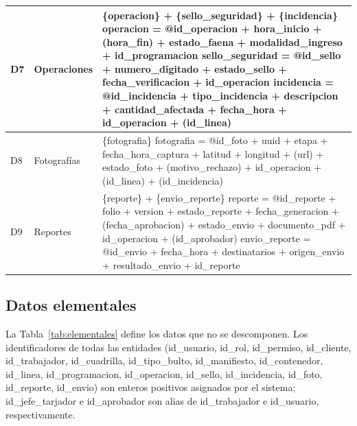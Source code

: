 {\begin{longtable}{|C{1.0cm}|L{2.4cm}|L{11.2cm}|}
D7 & Operaciones & \{operacion\} + \{sello\_seguridad\} + \{incidencia\} \newline
operacion = @id\_operacion + hora\_inicio + (hora\_fin) + estado\_faena +
modalidad\_ingreso + id\_programacion \newline
sello\_seguridad = @id\_sello + numero\_digitado + estado\_sello + fecha\_verificacion +
id\_operacion \newline
incidencia = @id\_incidencia + tipo\_incidencia + descripcion + cantidad\_afectada +
fecha\_hora + id\_operacion + (id\_linea) \\ \hline
D8 & Fotografías & \{fotografia\} \newline
fotografia = @id\_foto + uuid + etapa + fecha\_hora\_captura + latitud + longitud + (url) +
estado\_foto + (motivo\_rechazo) + id\_operacion + (id\_linea) + (id\_incidencia) \\ \hline
D9 & Reportes & \{reporte\} + \{envio\_reporte\} \newline
reporte = @id\_reporte + folio + version + estado\_reporte + fecha\_generacion +
(fecha\_aprobacion) + estado\_envio + documento\_pdf + id\_operacion + (id\_aprobador)
\newline
envio\_reporte = @id\_envio + fecha\_hora + destinatarios + origen\_envio +
resultado\_envio + id\_reporte \\ \hline
\end{longtable}
}

\subsection{Datos elementales}

La Tabla~\ref{tab:elementales} define los datos que no se descomponen. Los identificadores
de todas las entidades (id\_usuario, id\_rol, id\_permiso, id\_cliente, id\_trabajador,
id\_cuadrilla, id\_tipo\_bulto, id\_manifiesto, id\_contenedor, id\_linea, id\_programacion,
id\_operacion, id\_sello, id\_incidencia, id\_foto, id\_reporte, id\_envio) son enteros
positivos asignados por el sistema; id\_jefe\_tarjador e id\_aprobador son alias de
id\_trabajador e id\_usuario, respectivamente.

